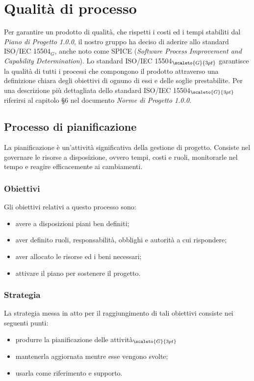 \chapter{Qualità di processo}\label{QualitàDelProcesso}
Per garantire un prodotto di qualità, che rispetti i costi ed i tempi stabiliti dal \textit{Piano di Progetto 1.0.0}, il nostro gruppo ha deciso di aderire allo standard ISO/IEC 15504$_G$, anche noto come SPICE (\textit{Software Process Improvement and Capability Determination}).
Lo standard ISO/IEC 15504$_{\scaleto{G}{3pt}}$ garantisce la qualità di tutti i processi che compongono il prodotto attraverso una definizione chiara degli obiettivi di ognuno di essi e delle soglie prestabilite. 
Per una descrizione più dettagliata dello standard ISO/IEC 15504$_{\scaleto{G}{3pt}}$
riferirsi al capitolo §6 nel documento \textit{Norme di Progetto 1.0.0}.
\section{Processo di pianificazione}\label{QualitàDelProcessoProcessoDiPianificazione}
La pianificazione è un’attività significativa della gestione di progetto. 
Consiste nel governare le risorse a disposizione, ovvero tempi, costi e ruoli, monitorarle nel tempo e reagire efficacemente ai cambiamenti. 

\subsection{Obiettivi}\label{QualitàDelProcessoProcessoDiPianificazioneObiettivi}
Gli obiettivi relativi a questo processo sono:
\begin{itemize}
	\item avere a disposizioni piani ben definiti;
	\item aver definito ruoli, responsabilità, obblighi e autorità a cui rispondere;
	\item aver allocato le risorse ed i beni necessari;
	\item attivare il piano per sostenere il progetto.
\end{itemize}

\subsection{Strategia}\label{QualitàDelProcessoProcessoDiPianificazioneStrategia}
La strategia messa in atto per il raggiungimento di tali obiettivi consiste nei seguenti punti:
\begin{itemize}
	\item produrre la pianificazione delle attività$_{\scaleto{G}{3pt}}$
	\item mantenerla aggiornata mentre esse vengono svolte;
	\item usarla come riferimento e supporto.
\end{itemize}

